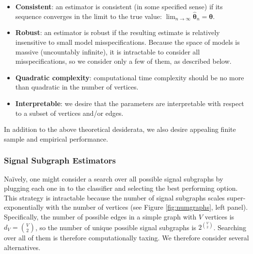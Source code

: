 \documentclass[10pt,journal,cspaper,compsoc]{IEEEtran}
\providecommand{\ve}[1]{\boldsymbol{#1}}
\newcommand{\bth}{\ve{\theta}}
\newcommand{\bhth}{\wh{\ve{\theta}}}
\providecommand{\mc}[1]{\mathcal{#1}}
\providecommand{\wh}[1]{\widehat{#1}}
\newcommand{\conv}{\rightarrow}
\begin{document}
\begin{itemize}
	\item \textbf{Consistent}: an estimator is consistent (in some specified sense) if its sequence converges in the limit to the true value: $\lim_{n \conv \infty} \bhth_n = \bth$.  %
	\item \textbf{Robust}: an estimator is robust if the resulting estimate is relatively insensitive to small model misspecifications.  Because the space of models is massive (uncountably infinite), it is intractable to consider all misspecifications, so we consider only a few of them, as described below.
	\item \textbf{Quadratic complexity}: computational time complexity should be no more than quadratic in the number of vertices.
	\item \textbf{Interpretable}: we desire that the parameters are interpretable with respect to a subset of vertices and/or edges.
\end{itemize}
In addition to the above theoretical desiderata, we also desire appealing finite sample and empirical performance.


\subsubsection{Signal Subgraph Estimators} %
\label{ssub:subsubsection_name1}


Na\"{i}vely, one might consider a search over all possible signal subgraphs by plugging each one in to the classifier and selecting the best performing option.  This strategy is intractable because the number of signal subgraphs scales super-exponentially with the number of vertices (see Figure \ref{fig:numgraphs}, left panel). Specifically, the number of possible edges in a simple graph with $V$ vertices is $d_V=\binom{V}{2}$, so the number of unique possible signal subgraphs is $2^{\binom{V}{2}}$.  Searching over all of them is therefore computationally taxing. %
We therefore consider several alternatives.
\end{document}
